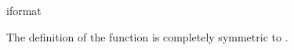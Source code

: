 \begin{ccRefFunction}{iformat}

The definition of the function  is completely symmetric to .

\end{ccRefFunction}